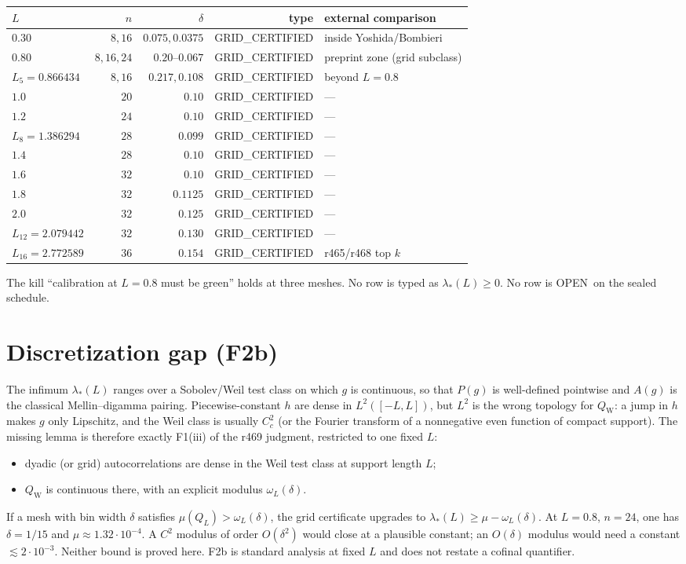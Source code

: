 \documentclass[11pt]{article}
\newcommand{\QW}{Q_{\mathrm W}}
\newcommand{\cert}{\textcolor{green!40!black}{GRID\_CERTIFIED}}
\newcommand{\open}{\textcolor{orange!85!black}{OPEN}}
\begin{document}
\begin{center}
\small
\begin{tabular}{@{}lrrrl@{}}
\toprule
$L$ & $n$ & $\delta$ & type & external comparison\\
\midrule
$0.30$ & $8,16$ & $0.075,0.0375$ & \cert & inside Yoshida/Bombieri\\
$0.80$ & $8,16,24$ & $0.20$--$0.067$ & \cert & preprint zone (grid subclass)\\
$L_5=0.866434$ & $8,16$ & $0.217,0.108$ & \cert & beyond $L=0.8$\\
$1.0$ & $20$ & $0.10$ & \cert & ---\\
$1.2$ & $24$ & $0.10$ & \cert & ---\\
$L_8=1.386294$ & $28$ & $0.099$ & \cert & ---\\
$1.4$ & $28$ & $0.10$ & \cert & ---\\
$1.6$ & $32$ & $0.10$ & \cert & ---\\
$1.8$ & $32$ & $0.1125$ & \cert & ---\\
$2.0$ & $32$ & $0.125$ & \cert & ---\\
$L_{12}=2.079442$ & $32$ & $0.130$ & \cert & ---\\
$L_{16}=2.772589$ & $36$ & $0.154$ & \cert & r465/r468 top $k$\\
\bottomrule
\end{tabular}
\end{center}

The kill ``calibration at $L=0.8$ must be green'' holds at three
meshes.  No row is typed as $\lambda_*(L)\ge 0$.  No row is
\open\ on the sealed schedule.

\section{Discretization gap (F2b)}

The infimum $\lambda_*(L)$ ranges over a Sobolev/Weil test class on
which $g$ is continuous, so that $P(g)$ is well-defined pointwise and
$A(g)$ is the classical Mellin--digamma pairing.  Piecewise-constant
$h$ are dense in $L^2([-L,L])$, but $L^2$ is the wrong topology for
$\QW$: a jump in $h$ makes $g$ only Lipschitz, and the Weil class is
usually $C^2_c$ (or the Fourier transform of a nonnegative even
function of compact support).  The missing lemma is therefore exactly
F1(iii) of the r469 judgment, restricted to one fixed $L$:

\begin{itemize}
\item dyadic (or grid) autocorrelations are dense in the Weil test
class at support length $L$;
\item $\QW$ is continuous there, with an explicit modulus
$\omega_L(\delta)$.
\end{itemize}
If a mesh with bin width $\delta$ satisfies
$\mu(Q_L)>\omega_L(\delta)$, the grid certificate upgrades to
$\lambda_*(L)\ge\mu-\omega_L(\delta)$.  At $L=0.8$, $n=24$, one has
$\delta=1/15$ and $\mu\approx 1.32\cdot 10^{-4}$.  A $C^2$ modulus of
order $O(\delta^2)$ would close at a plausible constant; an $O(\delta)$
modulus would need a constant $\lesssim 2\cdot 10^{-3}$.  Neither
bound is proved here.  F2b is standard analysis at fixed $L$ and does
not restate a cofinal quantifier.
\end{document}
